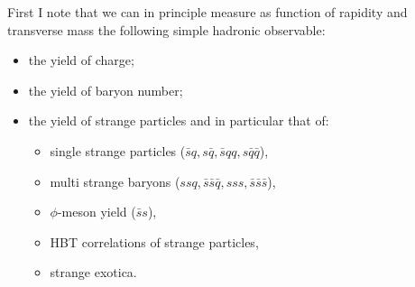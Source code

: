 \begin{mdframed}[linecolor=gray,roundcorner=12pt,backgroundcolor=Dandelion!15,linewidth=1pt,leftmargin=0cm,rightmargin=0cm,topline=true,bottomline=true,skipabove=12pt]
First I note that we can in principle measure as function of rapidity and transverse mass the following simple hadronic observable:
\begin{itemize}
\item the yield of charge;
\item the yield of baryon number;
\item the yield of strange particles and in particular that of:
\begin{itemize}
\item single strange particles ($\bar s q, s\bar q, \bar s qq, s\bar q\bar q$),
\item multi strange baryons ($ssq, \bar s\bar s\bar q, sss, \bar s\bar s\bar s$),
\item $\phi$-meson yield ($\bar s s$),
\item HBT correlations of strange particles,
\item strange exotica.
\end{itemize}
\end{itemize}


\end{mdframed}

